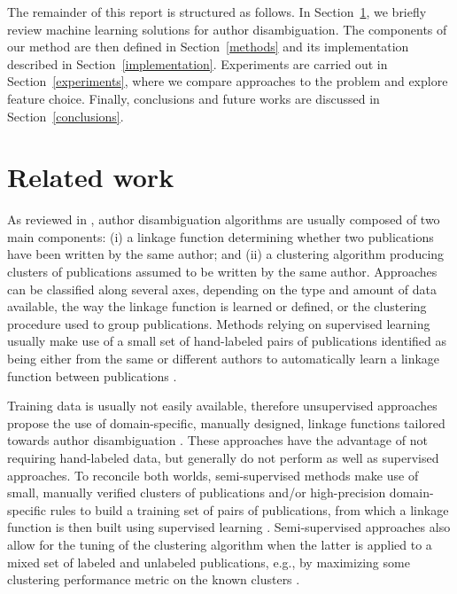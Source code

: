\documentclass[runningheads,a4paper]{llncs}
\makeatletter
\newcommand*{\eg}{e.g.\@\xspace}
\newcommand{\longpage}{\enlargethispage{\baselineskip}}
\makeatother
\begin{document}
The remainder of this report is structured as follows. In Section~\ref{related-works},
we briefly review machine learning solutions for author disambiguation. The components of our method are then defined in Section~\ref{methods} and its implementation described in Section~\ref{implementation}. Experiments
are carried out in Section~\ref{experiments}, where we compare
approaches to the problem and explore feature choice.
Finally, conclusions and future works are discussed in Section~\ref{conclusions}.


\section{Related work}
\label{related-works}

\longpage

As reviewed in \cite{smalheiser2009author,ferreira2012brief,levin2012citation}, author
disambiguation algorithms are usually composed of two main components: (i) a
linkage function determining whether two publications have been written by the
same author; and (ii) a clustering algorithm producing clusters of publications
assumed to be written by the same author.
Approaches can be classified along several axes, depending on the type and
amount of data available, the way the linkage function is learned or defined, or the
clustering procedure used to group publications.
Methods relying on supervised learning usually make use of a small set of hand-labeled pairs
of publications identified as being either from the same or different authors to automatically learn a linkage
function between publications \cite{han2004two,huang2006efficient, culotta2007author,treeratpituk2009disambiguating,tran2014author}.

Training data is usually not easily available, therefore unsupervised approaches propose
the use of domain-specific, manually designed, linkage functions tailored towards author
disambiguation \cite{malin2005unsupervised,song2007efficient, kang2009co,schulz2014exploiting}.
These approaches have the advantage of not requiring hand-labeled data, but generally do
not perform as well as supervised approaches.
To reconcile both worlds, semi-supervised methods make use of small, manually verified clusters of
publications and/or high-precision domain-specific rules to build a training
set of pairs of publications, from which a linkage function is then built using supervised learning
\cite{ferreira2010effective,torvik2009author,levin2012citation}. Semi-supervised approaches also allow for the tuning of the
clustering algorithm when the latter is applied to a mixed set of labeled
and unlabeled publications, \eg, by maximizing some clustering performance
metric on the known clusters \cite{levin2012citation}.
\end{document}
